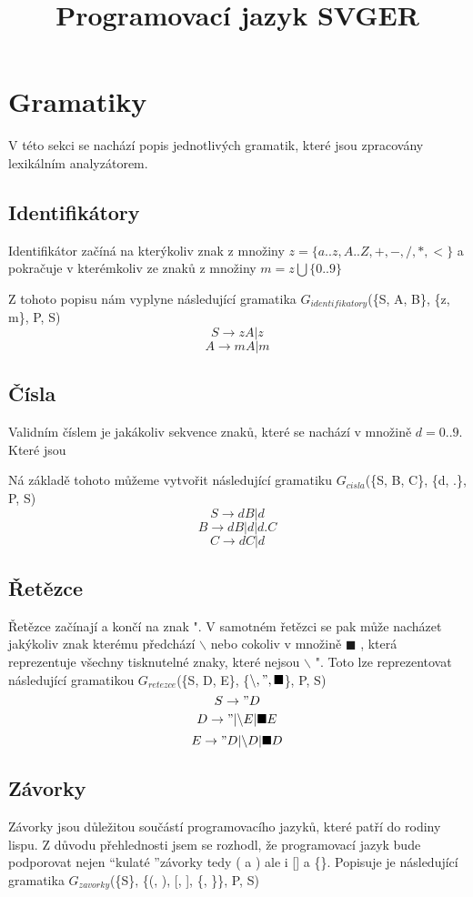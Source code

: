 \documentclass[a4paper,11pt]{article}
\title{Programovací jazyk SVGER}
\begin{document}
\maketitle

\newpage
\tableofcontents

\newpage
\section{Gramatiky}
V této sekci se nachází popis jednotlivých gramatik, které jsou zpracovány lexikálním analyzátorem.

\subsection{Identifikátory}
Identifikátor začíná na kterýkoliv znak z množiny $z = \{a..z, A..Z, +, -, /, *, <\}$
a pokračuje v kterémkoliv ze znaků z množiny $m = z \bigcup \{0..9\}$ 
\linebreak

Z tohoto popisu nám vyplyne následující gramatika $G_{identifikatory}$(\{S, A, B\}, \{z, m\}, P, S)
$$S \rightarrow zA | z$$
$$A \rightarrow mA | m$$

\subsection{Čísla}
Validním číslem je jakákoliv sekvence znaků, které se nachází v množině $d = {0..9}$. Které jsou

Ná základě tohoto můžeme vytvořit následující gramatiku
$G_{cisla}$(\{S, B, C\}, \{d, .\}, P, S)
$$S \rightarrow dB | d$$
$$B \rightarrow dB | d | d.C$$
$$C \rightarrow dC | d$$

\subsection{Řetězce}
Řetězce začínají a končí na znak ". V samotném řetězci se pak může nacházet jakýkoliv znak kterému   předchází $\backslash$ nebo cokoliv v množině $\blacksquare$
 , která reprezentuje všechny tisknutelné znaky, které nejsou $\backslash$ ".
Toto lze reprezentovat následující gramatikou $G_{retezce}$(\{S, D, E\}, \{$\backslash, ", \blacksquare$\}, P, S)
$$S \rightarrow "D$$
$$D \rightarrow " | \backslash E | \blacksquare E$$
$$E \rightarrow "D | \backslash D | \blacksquare D$$

\subsection{Závorky}
Závorky jsou důležitou součástí programovacího jazyků, které patří do rodiny lispu. Z důvodu přehlednosti jsem se rozhodl, že programovací jazyk bude podporovat nejen \textquotedblleft kulaté \textquotedblright  závorky tedy ( a ) ale i [] a \{\}. Popisuje je následující gramatika $G_{zavorky}$(\{S\}, \{(, ), [, ], \{, \}\}, P, S)
\end{document}
